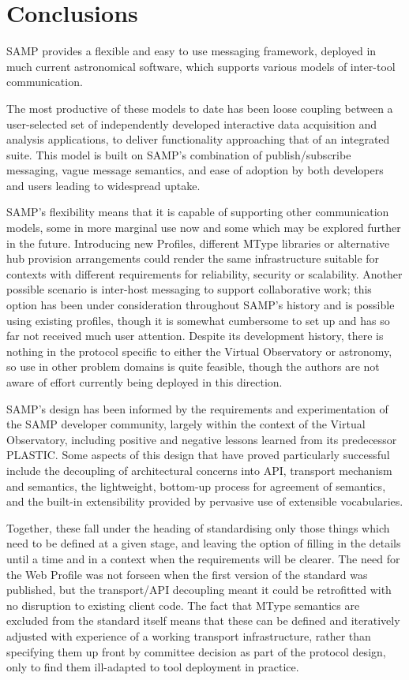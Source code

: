 \documentclass[5p]{elsarticle}
\begin{document}
\section{Conclusions} \label{sec:conclusion}

SAMP provides a flexible and easy to use messaging framework,
deployed in much current astronomical software,
which supports various models of inter-tool communication.

The most productive of these models to date has been loose coupling
between a user-selected set of independently developed
interactive data acquisition and analysis applications,
to deliver functionality approaching that of an
integrated suite.
This model is built on SAMP's combination of
publish/subscribe messaging,
vague message semantics,
and ease of adoption by both developers and users
leading to widespread uptake.

SAMP's flexibility means that it is capable of supporting other
communication models, some in more marginal use now
and some which may be explored further in the future.
Introducing new Profiles, different MType libraries or
alternative hub provision arrangements could render the same
infrastructure suitable for contexts with different
requirements for reliability, security or scalability.
Another possible scenario is inter-host messaging to
support collaborative work;
this option has been under consideration throughout SAMP's history
and is possible using existing profiles,
though it is somewhat cumbersome to set up and has so far not
received much user attention.
Despite its development history, there is nothing in the protocol
specific to either the Virtual Observatory or astronomy,
so use in other problem domains is quite feasible,
though the authors are not aware of effort currently being
deployed in this direction.

SAMP's design has been informed by the requirements and experimentation
of the SAMP developer community, largely within the context of
the Virtual Observatory,
including positive and negative lessons learned from its predecessor PLASTIC.
Some aspects of this design that have proved particularly successful
include
the decoupling of architectural concerns into API, transport
mechanism and semantics,
the lightweight, bottom-up process for agreement of semantics,
and the built-in extensibility provided by pervasive use of
extensible vocabularies.

Together, these fall under the heading of standardising
only those things which need to be defined at a given stage,
and leaving the option of filling in the details until a time
and in a context when the requirements will be clearer.
The need for the Web Profile was not forseen when the first version
of the standard was published, but the transport/API decoupling
meant it could be retrofitted with no disruption to existing client code.
The fact that MType semantics are excluded from the standard
itself means that these can be defined and iteratively adjusted with
experience of a working transport infrastructure, rather than
specifying them up front by committee decision as part of the
protocol design, only to find them ill-adapted to tool
deployment in practice.
\end{document}
